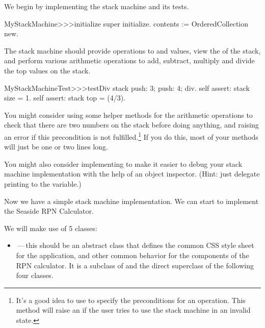 \documentclass[a4paper,10pt,twoside]{book}
\begin{document}
{{We begin by implementing the stack machine and its tests.


\begin{code}{}
MyStackMachine>>>initialize
	super initialize.
	contents := OrderedCollection new.
\end{code}

The stack machine should provide operations to  and  values, view the  of the stack, and perform various arithmetic operations to add, subtract, multiply and divide the top values on the stack.


\begin{code}{}
MyStackMachineTest>>>testDiv
	stack
		push: 3;
		push: 4;
		div.
	self assert: stack size = 1.
	self assert: stack top = (4/3).
\end{code}

You might consider using some helper methods for the arithmetic operations to check that there are two numbers on the stack before doing anything, and raising an error if this precondition is not fulfilled.\footnote{It's a good idea to use  to specify the preconditions for an operation.
This method will raise an  if the user tries to use the stack machine in an invalid state.}
If you do this, most  of your methods will just be one or two lines long.

You might also consider implementing  to make it easier to debug your stack machine implementation with the help of an object inspector.
(Hint: just delegate printing to the  variable.)


Now we have a simple stack machine implementation.
We can start to implement the Seaside RPN Calculator.

We will make use of 5 classes:
\begin{itemize}
  \item {}\,---\,this should be an abstract class that defines the common CSS style sheet for the application, and other common behavior for the components of the RPN calculator.
  It is a subclass of  and the direct superclass of the following four classes. 
  

\end{itemize}}}
\end{document}
